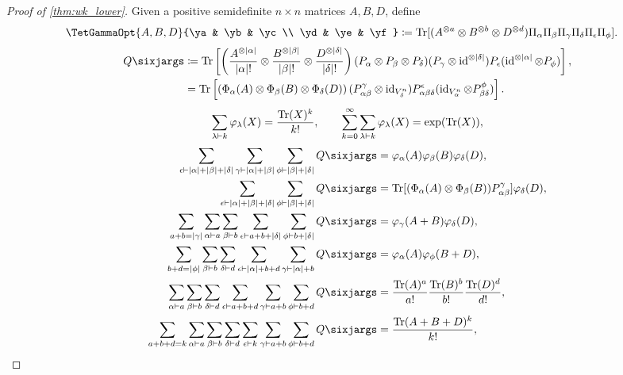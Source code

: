 \documentclass[notitlepage, 10pt]{article}
\begin{document}
\begin{proof}[Proof of \cref{thm:wk_lower}]
    Given a positive semidefinite $n\times n$ matrices $A,B,D$, define
    \begin{align}
        \TetGammaOpt{A,B,D}{\ya & \yb & \yc \\ \yd & \ye & \yf} 
        &\coloneqq \Tr[(A^{\ot a} \ot B^{\ot b} \ot D^{\ot d}) \Pi_{\ya}\Pi_{\yb}\Pi_{\yc}\Pi_{\yd}\Pi_{\ye}\Pi_{\yf}].
    \end{align}
    \begin{align}
        Q\sixjargs 
        &\coloneqq \Tr\left[\left(\frac{A^{\ot {\sya}}}{{\sya}!} \ot \frac{B^{\ot {\syb}}}{{\syb}!} \ot \frac{D^{\ot {\syd}}}{{\syd}!}\right) (P_{\ya}\ot P_{\yb} \ot P_{\yd})(P_{\yc}\ot \id^{\ot {\syd}})P_{\ye}(\id^{\ot {\sya}} \ot P_{\yf})\right], \\
        &= \Tr\left[\left(\Phi_{\ya}(A) \ot \Phi_{\yb}(B) \ot \Phi_{\yd}(D)\right) (P^{\yc}_{\ya\yb}\ot \id_{V_{\yd}^{n}})P^{\ye}_{\ya\yb\yd}(\id_{V_{\ya}^{n}} \ot P^{\yf}_{\yb\yd})\right].
    \end{align}
    \begin{equation}
        \sum_{\lambda\vdash k}\varphi_{\lambda}(X) = \frac{\operatorname{Tr}(X)^{k}}{k!},
        \qquad
        \sum_{k=0}^{\infty}\sum_{\lambda\vdash k}\varphi_{\lambda}(X) = \exp(\operatorname{Tr}(X)),
    \end{equation}
    \begin{align}
        \sum_{\ye\vdash {\sya}+{\syb}+{\syd}}\sum_{\yc\vdash {\sya}+{\syb}}\sum_{\yf\vdash {\syb}+{\syd}}Q\sixjargs &= \varphi_{\ya}(A)\varphi_{\yb}(B)\varphi_{\yd}(D), \\
        \sum_{\ye\vdash {\sya}+{\syb}+{\syd}}\sum_{\yf\vdash {\syb}+{\syd}}Q\sixjargs &= \Tr[(\Phi_{\ya}(A) \ot \Phi_{\yb}(B)) P^{\yc}_{\ya\yb}]\varphi_{\yd}(D), \\
        \sum_{a+b={\syc}}\sum_{\ya\vdash a}\sum_{\yb\vdash b}\sum_{\ye\vdash a+b+{\syd}}\sum_{\yf\vdash b+{\syd}}Q\sixjargs &= \varphi_{\yc}(A+B)\varphi_{\yd}(D), \\
        \sum_{b+d={\syf}}\sum_{\yb\vdash b}\sum_{\yd\vdash d}\sum_{\ye\vdash {\sya}+b+d}\sum_{\yc\vdash {\sya}+b}Q\sixjargs &= \varphi_{\ya}(A)\varphi_{\yf}(B+D), \\
        \sum_{\ya\vdash a}\sum_{\yb\vdash b}\sum_{\yd \vdash d}\sum_{\ye\vdash a+b+d}\sum_{\yc\vdash a+b}\sum_{\yf\vdash b+d}Q\sixjargs &= \frac{\Tr(A)^{a}}{a!}\frac{\Tr(B)^{b}}{b!}\frac{\Tr(D)^{d}}{d!}, \\
        \sum_{a+b+d=k}\sum_{\ya\vdash a}\sum_{\yb\vdash b}\sum_{\yd \vdash d}\sum_{\ye\vdash k}\sum_{\yc\vdash a+b}\sum_{\yf\vdash b+d}Q\sixjargs &= \frac{\Tr(A+B+D)^{k}}{k!}, \\

\end{align}
\end{proof}
\end{document}
